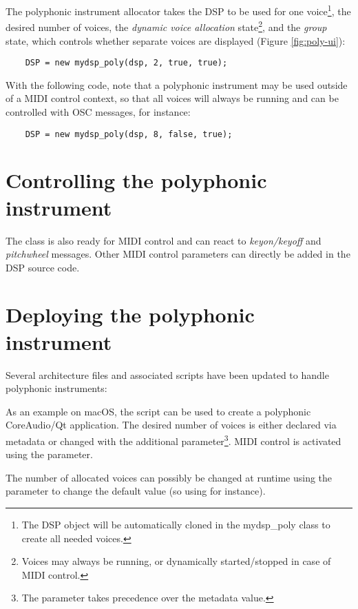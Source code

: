 The polyphonic instrument allocator takes the DSP to be used for one voice\footnote{The DSP object will be automatically cloned in the mydsp\_poly class to create all needed voices.}, the desired number of voices, the {\it dynamic voice allocation} state\footnote{Voices may always be running, or dynamically started/stopped in case of MIDI control.}, and the {\it group} state, which controls whether separate voices are displayed (Figure \ref{fig:poly-ui}): 

\footnotesize
\begin{lstlisting}
    DSP = new mydsp_poly(dsp, 2, true, true);  
\end{lstlisting}
    
\normalsize
With the following code, note that a polyphonic instrument may be used outside of a MIDI control context, so that all voices will always be running and can be controlled with OSC messages, for instance:

\footnotesize
\begin{lstlisting}
    DSP = new mydsp_poly(dsp, 8, false, true);
\end{lstlisting}

\normalsize
    
\section{Controlling the polyphonic instrument}

The  class is also ready for MIDI control and can react to {\it keyon/keyoff} and {\it pitchwheel} messages. Other MIDI control parameters can directly be added in the DSP source code. 

\section{Deploying the polyphonic instrument}

Several architecture files and associated scripts have been updated to handle polyphonic instruments:

As an example on macOS, the script  can be used to create a polyphonic CoreAudio/Qt application. The desired number of voices is either declared via  metadata or changed with the  additional parameter\footnote{The  parameter takes precedence over the metadata value.}. MIDI control is activated using the  parameter. 

The number of allocated voices can possibly be changed at runtime using the  parameter to change the default value (so using  for instance). 


